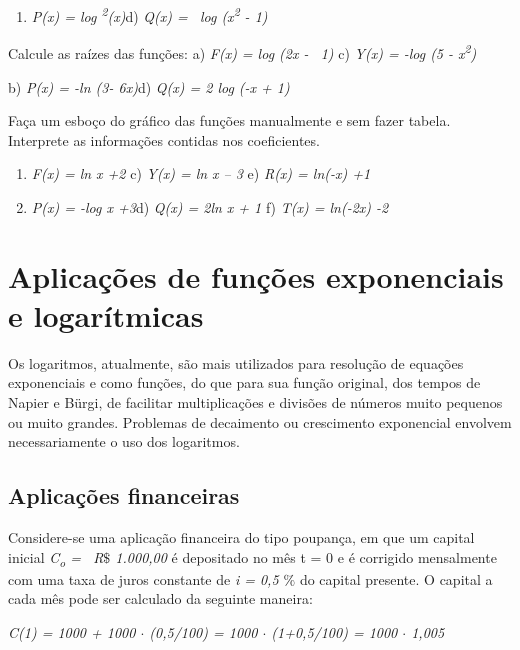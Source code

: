 \begin{exercicios}
\begin{enumerate}
	    \item \textit{P(x) = log \textsuperscript{2}(x)\quad \quad \quad }d) \textit{Q(x) =~ log (x\textsuperscript{2} - 1)}
    \end{enumerate}

    \exitem{} Calcule as raízes das funções:
    a) \textit{F(x) = log (2x -~ 1) \quad }\quad c) \textit{Y(x) = -log (5 - x\textsuperscript{2})}

    b) \textit{P(x) = -ln (3- 6x)\quad \quad }\quad d) \textit{Q(x) = 2 log (-x + 1)}

    \exitem{} Faça um esboço do gráfico das funções manualmente e sem fazer tabela. Interprete as informações contidas nos coeficientes.
    \begin{enumerate}
    	\item \textit{F(x) = ln x +2} \quad \quad c) \textit{Y(x) = ln x – 3 \quad }e)\textit{ R(x) = ln(-x) +1}

	    \item \textit{P(x) = -log x +3\quad }\quad d) \textit{Q(x) = 2ln x + 1 \quad }f)\textit{ T(x) = ln(-2x) -2} 
    \end{enumerate}
\end{exercicios}

\section{Aplicações de funções exponenciais e logarítmicas}

Os logaritmos, atualmente, são mais utilizados para resolução de equações exponenciais e como funções, do que para sua função original, dos tempos de Napier e Bürgi, de facilitar multiplicações e divisões de números muito pequenos ou muito grandes. Problemas de decaimento ou crescimento exponencial envolvem necessariamente o uso dos logaritmos.

\subsection{Aplicações financeiras}

Considere-se uma aplicação financeira do tipo poupança, em que um capital inicial \textit{C\textsubscript{o }=~ R$\$$  1.000,00} é depositado no mês t = 0 e é corrigido mensalmente com uma taxa de juros constante de \textit{i = 0,5 $\%$ } do capital presente. O capital a cada mês pode ser calculado da seguinte maneira:

\textit{C(1) = 1000 + 1000 $ \cdot $  (0,5/100) = 1000 $ \cdot $  (1+0,5/100) = 1000 $ \cdot $  1,005}

